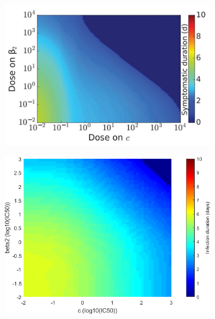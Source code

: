 \documentclass[a4paper,11pt]{article}
\begin{document}
\begin{figure}[H]
\begin{subfigure}{0.4\textwidth}
    \includegraphics[width=\textwidth]{MBeta2CT.png}
    \end{subfigure}
    \begin{subfigure}{0.35\textwidth}

    \includegraphics[width=\textwidth]{Beta2C_times.png}
    \end{subfigure}

    \begin{subfigure}{0.4\textwidth}


\end{subfigure}
\end{figure}
\end{document}
